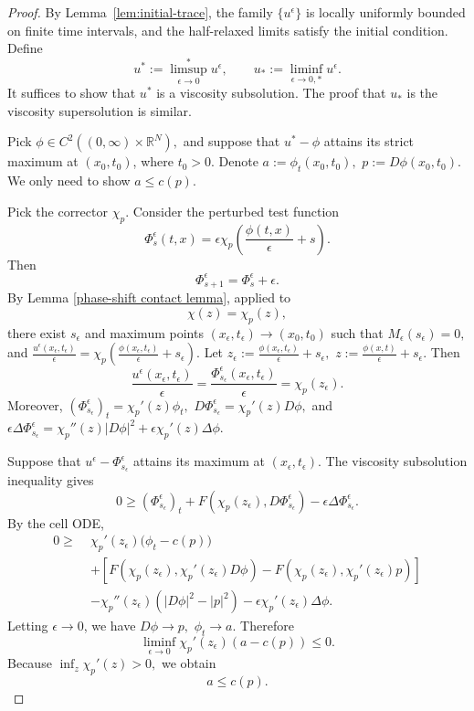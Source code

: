 \documentclass[preprint]{elsarticle}
\numberwithin{equation}{section}
\begin{document}
\medskip
\begin{proof}
 By Lemma~\ref{lem:initial-trace}, the family $\{u^\epsilon\}$ is locally uniformly bounded on finite time intervals, and the half-relaxed limits satisfy the initial condition.
 Define
$$
u^*:={\limsup}_{\epsilon\to0}^{*}u^\epsilon,
\qquad
u_*:={\liminf}_{\epsilon\to0,*}u^\epsilon.
$$
It suffices to show that $u^*$ is a viscosity subsolution. The proof that $u_*$ is the viscosity supersolution is similar.

Pick
$
\phi\in C^2((0,\infty)\times\mathbb R^N),
$
and suppose that $u^*-\phi$ attains its strict maximum at $(x_0,t_0)$, where $t_0>0$. Denote
$
a:=\phi_t(x_0,t_0),
$ $
p:=D\phi(x_0,t_0).
$
We only need to show
$
a\le c(p).
$

Pick the corrector $\chi_p$. Consider the perturbed test function
\begin{equation*}
\Phi_s^\epsilon(t,x)
=
\epsilon\chi_p\left(\frac{\phi(t,x)}{\epsilon}+s\right).
\end{equation*}
Then
$$
\Phi_{s+1}^\epsilon=\Phi_s^\epsilon+\epsilon.
$$
By Lemma \ref{phase-shift contact lemma}, applied to
$$
\chi(z)=\chi_p(z),
$$
there exist $s_\epsilon$ and maximum points $(x_\epsilon,t_\epsilon)\to(x_0,t_0)$ such that $M_\epsilon(s_\epsilon)=0,$
and $\frac{u^\epsilon(x_\epsilon,t_\epsilon)}{\epsilon}
=
\chi_p\left(
\frac{\phi(x_\epsilon,t_\epsilon)}{\epsilon}+s_\epsilon
\right).$
Let
$
z_\epsilon:=
\frac{\phi(x_\epsilon,t_\epsilon)}{\epsilon}+s_\epsilon,
$ $
z:=
\frac{\phi(x,t)}{\epsilon}+s_\epsilon.
$
Then
\begin{equation*}
\frac{u^\epsilon(x_\epsilon,t_\epsilon)}{\epsilon}
=
\frac{\Phi_{s_\epsilon}^\epsilon(x_\epsilon,t_\epsilon)}{\epsilon}
=
\chi_p(z_\epsilon).
\end{equation*}
Moreover,
$
(\Phi_{s_\epsilon}^\epsilon)_t
=
\chi_p'(z)\phi_t,
$ $
D\Phi_{s_\epsilon}^\epsilon
=
\chi_p'(z)D\phi,
$
and
$
\epsilon\Delta\Phi_{s_\epsilon}^\epsilon
=
\chi_p''(z)|D\phi|^2
+
\epsilon\chi_p'(z)\Delta\phi.
$

Suppose that $u^\epsilon-\Phi_{s_\epsilon}^\epsilon$ attains its maximum at $(x_\epsilon,t_\epsilon)$. The viscosity subsolution inequality gives
\begin{equation*}
0\ge
(\Phi_{s_\epsilon}^\epsilon)_t
+
F\left(\chi_p(z_\epsilon),D\Phi_{s_\epsilon}^\epsilon\right)
-
\epsilon\Delta\Phi_{s_\epsilon}^\epsilon.
\end{equation*}
By the cell ODE,
\begin{align*}
0\ge\;&
\chi_p'(z_\epsilon)\bigl(\phi_t-c(p)\bigr)
\\
&+
\left[
F\left(\chi_p(z_\epsilon),\chi_p'(z_\epsilon)D\phi\right)
-
F\left(\chi_p(z_\epsilon),\chi_p'(z_\epsilon)p\right)
\right]
\\
&-
\chi_p''(z_\epsilon)\left(|D\phi|^2-|p|^2\right)
-
\epsilon\chi_p'(z_\epsilon)\Delta\phi .
\end{align*}
Letting $\epsilon\to0$, we have
$
D\phi\to p,
$ $
\phi_t\to a.
$
Therefore
\begin{equation*}
\liminf_{\epsilon\to0}\chi_p'(z_\epsilon)(a-c(p))\le0.
\end{equation*}
Because
$
\inf_z \chi_p'(z)>0,
$
we obtain
$$
a\le c(p).
$$


\end{proof}
\end{document}
